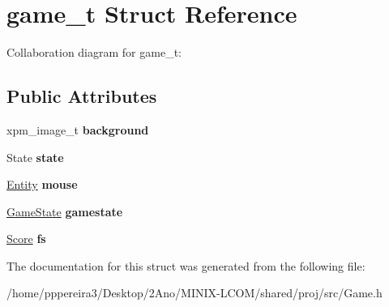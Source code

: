 \hypertarget{structgame__t}{}\section{game\+\_\+t Struct Reference}
\label{structgame__t}


Collaboration diagram for game\+\_\+t\+:
\subsection*{Public Attributes}
\begin{DoxyCompactItemize}
\item 
xpm\+\_\+image\+\_\+t {\bfseries background}
\item 
State {\bfseries state}
\item 
\hyperlink{structentity__t}{Entity} {\bfseries mouse}
\item 
\hyperlink{structgamestate__t}{Game\+State} {\bfseries gamestate}
\item 
\hyperlink{structscore__t}{Score} {\bfseries fs}
\end{DoxyCompactItemize}


The documentation for this struct was generated from the following file\+:\begin{DoxyCompactItemize}
\item 
/home/pppereira3/\+Desktop/2\+Ano/\+M\+I\+N\+I\+X-\/\+L\+C\+O\+M/shared/proj/src/Game.\+h\end{DoxyCompactItemize}
